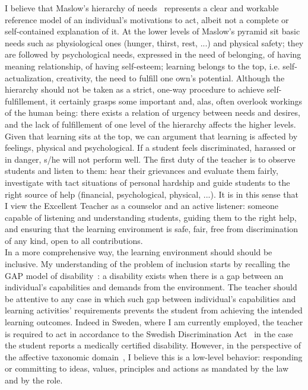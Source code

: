 \documentclass[
  a4paper, 
]{fortysecondscv}
\begin{document}
I believe that Maslow’s hierarchy of needs~\cite{maslow1954} represents a clear and workable reference model of an individual’s motivations to act, albeit not a complete or self-contained explanation of it. At the lower levels of Maslow's pyramid sit basic needs such as physiological ones (hunger, thirst, rest, ...) and physical safety; they are followed by psychological needs, expressed in the need of belonging, of having meaning relationship, of having self-esteem; learning belongs to the top, i.e. self-actualization, creativity, the need to fulfill one own's potential. Although the hierarchy should not be taken as a strict, one-way procedure to achieve self-fulfillement, it certainly grasps some important and, alas, often overlook workings of the human being: there exists a relation of urgency between needs and desires, and the lack of fulfillement of one level of the hierarchy affects the higher levels. Given that learning sits at the top, we can argument that learning is affected by feelings, physical and psychological. If a student feels discriminated, harassed or in danger, s/he will not perform well. The first duty of the teacher is to observe students and listen to them: hear their grievances and evaluate them fairly, investigate with tact situations of personal hardship and guide students to the right source of help (financial, psychological, physical, ...). It is in this sense that I view the Excellent Teacher as a counselor and an active listener: someone capable of listening and understanding students, guiding them to the right help, and ensuring that the learning environment is safe, fair, free from discrimination of any kind, open to all contributions.\\
In a more comprehensive way, the learning environment should should be inclusive. My understanding of the problem of inclusion starts by recalling the GAP model of disability~\cite{ahlmark}: a disability exists when there is a gap between an individual’s capabilities and demands from the environment. The teacher should be attentive to any case in which such gap between individual’s capabilities and learning activities’ requirements prevents the student from achieving the intended learning outcomes. Indeed in Sweden, where I am currently employed, the teacher is required to act in accordance to the Swedish Discrimination Act~\cite{discri2008} in the case the student reports a medically certified disability. However, in the perspective of the affective taxonomic domain~\cite{krathwohl1973}, I believe this is a low-level behavior: responding or committing to ideas, values, principles and actions as mandated by the law and by the role.\\
\end{document}
